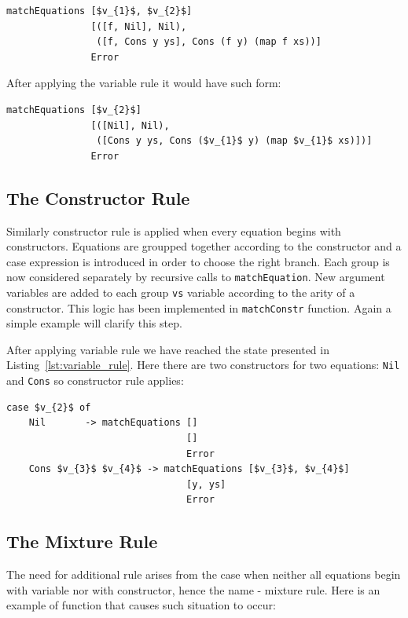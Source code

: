 \documentclass[12pt,a4paper]{report}
\begin{document}
\vspace*{0.2in}
\begin{lstlisting}[style=haskell,mathescape=true]
matchEquations [$v_{1}$, $v_{2}$]
               [([f, Nil], Nil),
                ([f, Cons y ys], Cons (f y) (map f xs))]
               Error
\end{lstlisting}
After applying the variable rule it would have such form:

\vspace*{0.2in}
\begin{lstlisting}[style=haskell,label=lst:variable_rule, caption={State after applying
  variable rule.}, mathescape=true]
matchEquations [$v_{2}$]
               [([Nil], Nil),
                ([Cons y ys, Cons ($v_{1}$ y) (map $v_{1}$ xs)])]
               Error
\end{lstlisting}

\subsection{The Constructor Rule}
\label{sec:constructor_rule}
Similarly constructor rule is applied when every equation begins with
constructors. Equations are groupped together according to the constructor and
a case expression is introduced in order to choose the right branch. Each group
is now considered separately by recursive calls to \texttt{matchEquation}. New
argument variables are added to each group \texttt{vs} variable according to
the arity of a constructor. This logic has been implemented in
\texttt{matchConstr} function. Again a simple example will clarify this step.

After applying variable rule we have reached the state presented in
Listing~\ref{lst:variable_rule}. Here there are two constructors for two
equations: \texttt{Nil} and \texttt{Cons} so constructor rule applies:

\vspace*{0.2in}
\begin{lstlisting}[style=haskell,label=lst:constructor_rule, caption={State after applying
  constructor rule.}, mathescape=true]
case $v_{2}$ of
    Nil       -> matchEquations []
                                []
                                Error
    Cons $v_{3}$ $v_{4}$ -> matchEquations [$v_{3}$, $v_{4}$]
                                [y, ys]
                                Error
\end{lstlisting}

\subsection{The Mixture Rule}
The need for additional rule arises from the case when neither all equations
begin with variable nor with constructor, hence the name - mixture rule. Here
is an example of function that causes such situation to occur:
\end{document}
